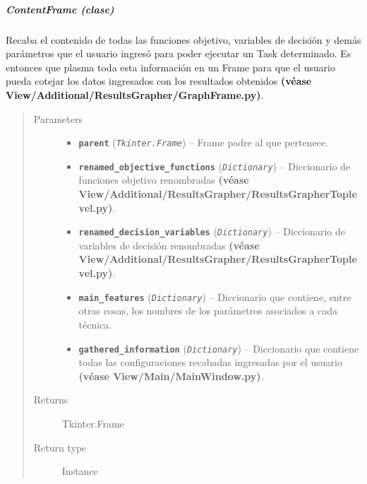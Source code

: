 \documentclass[class=report, crop=false]{standalone}
\begin{document}
\subparagraph{ContentFrame (clase)}
\label{sec:a_3_3_3_1_2_1}
\begin{fulllineitems}

\begin{DUlineblock}{0em}
\item[] Recaba el contenido de todas las funciones 
objetivo, variables de decisión y demás parámetros 
que el usuario ingresó para poder ejecutar un Task 
determinado.\break
Es entonces que plasma toda esta información en un 
Frame para que el usuario pueda cotejar los datos 
ingresados con los resultados obtenidos \textbf{(véase View/Additional/}\break\textbf{ResultsGrapher/GraphFrame.py)}.
\end{DUlineblock}

\begin{quote}\begin{description}
\item[{Parameters}] \leavevmode\begin{itemize}
\item \textbf{\texttt{parent}} (\emph{\texttt{Tkinter.Frame}}) -- Frame padre al que pertenece.
\item \textbf{\texttt{renamed\_objective\_functions}} (\emph{\texttt{Dictionary}}) -- Diccionario de funciones objetivo renombradas \textbf{(véase View/Additional/ResultsGrapher/ResultsGrapherToplevel.py)}.
\item \textbf{\texttt{renamed\_decision\_variables}} (\emph{\texttt{Dictionary}}) -- Diccionario de variables de decisión renombradas \textbf{(véase View/Additional/ResultsGrapher/ResultsGrapherToplevel.py)}.
\item \textbf{\texttt{main\_features}} (\emph{\texttt{Dictionary}}) -- Diccionario que contiene, entre otras cosas, los nombres de los parámetros asociados a cada técnica.
\item \textbf{\texttt{gathered\_information}} (\emph{\texttt{Dictionary}}) -- Diccionario que contiene todas las configuraciones  recabadas ingresadas por el usuario \textbf{(véase View/Main/MainWindow.py)}.
\end{itemize}

\item[{Returns}] \leavevmode
Tkinter.Frame
\item[{Return type}] \leavevmode
Instance
\end{description}\end{quote}

\end{fulllineitems}
\end{document}
